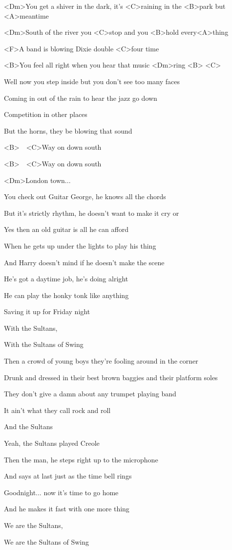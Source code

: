 

\zs
<Dm>You get a shiver in the dark, it's <C>raining in the <B>park but <A>meantime

<Dm>South of the river you <C>stop and you <B>hold every<A>thing

<F>A band is blowing Dixie double <C>four time

<B>You feel all right when you hear that music <Dm>ring <B> <C>
\ks

\zs
Well now you step inside but you don't see too many faces

Coming in out of the rain to hear the jazz go down

Competition in other places

But the horns, they be blowing that sound
\ks

\zr
<B>~~<C>Way on down south

<B>~~<C>Way on down south

<Dm>London town...
\kr

\zs
You check out Guitar George, he knows all the chords

But it's strictly rhythm, he doesn't want to make it cry or

Yes then an old guitar is all he can afford

When he gets up under the lights to play his thing
\ks

\zs
And Harry doesn't mind if he doesn't make the scene

He's got a daytime job, he's doing alright

He can play the honky tonk like anything

Saving it up for Friday night
\ks

\zr
With the Sultans,

With the Sultans of Swing
\kr

\zs
Then a crowd of young boys they're fooling around in the corner

Drunk and dressed in their best brown baggies and their platform soles

They don't give a damn about any trumpet playing band

It ain't what they call rock and roll
\ks

\zr
And the Sultans

Yeah, the Sultans played Creole
\kr

\zs
Then the man, he steps right up to the microphone

And says at last just as the time bell rings

Goodnight... now it's time to go home

And he makes it fast with one more thing
\ks

\zr
We are the Sultans,

We are the Sultans of Swing
\kr

\kp
